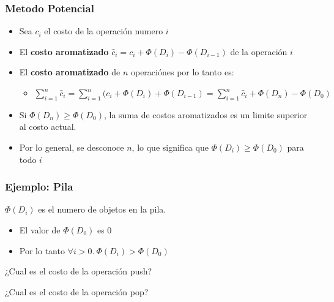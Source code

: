 \documentclass{beamer}
\begin{document}
\begin{frame}
\frametitle{Metodo Potencial}
\begin{itemize}
    \item{Sea $c_i$ el costo de la operaci\'on numero $i$}
    \item{El {\bf costo aromatizado} $\hat c_i=c_i+\Phi(D_i)-\Phi(D_{i-1})$ de
    la operaci\'on $i$}
    \item{El {\bf costo aromatizado} de $n$ operaci\'ones por lo tanto es:
    \begin{itemize}
        \item{$\sum_{i=1}^{n} \hat c_i = \sum_{i=1}^{n}(c_i+\Phi(D_i) + \Phi(D_{i-1})=
        \sum_{i=1}^n \hat c_i + \Phi(D_n) - \Phi(D_0)$}
    \end{itemize}
    }
    \item{Si $\Phi(D_n)\geq \Phi(D_0)$, la suma de costos aromatizados es un limite
    superior al costo actual.}
    \item{Por lo general, se desconoce $n$, lo que significa que $\Phi(D_i)\geq \Phi(D_0)$
    para todo $i$}
\end{itemize}
\end{frame}

\begin{frame}
\frametitle{Ejemplo: Pila}
\begin{itemize}
    \item{$\Phi(D_i)$ es el numero de objetos en la pila.
        \begin{itemize}
            \item{El valor de $\Phi(D_0)$ es $0$}
            \item{Por lo tanto $\forall i>0.\ \Phi(D_i)>\Phi(D_0)$}
        \end{itemize}
    \item{¿Cual es el costo de la operaci\'on push?}
    \item{¿Cual es el costo de la operaci\'on pop?}
    }
\end{itemize}
\end{frame}
\end{document}
